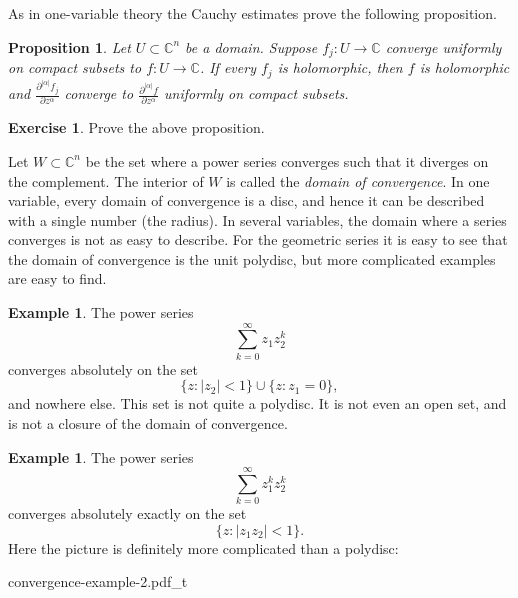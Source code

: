 \documentclass[12pt,openany]{book}
\newcommand{\sabs}[1]{\lvert {#1} \rvert}
\newcommand{\C}{{\mathbb{C}}}
\newcommand{\myindex}[1]{#1\index{#1}}
\theoremstyle{plain}
\newtheorem{prop}[thm]{Proposition}
\theoremstyle{remark}
\theoremstyle{definition}
\newenvironment{exbox}{%
    \def\FrameCommand{\vrule width 1pt \relax\hspace {10pt}}%
    \MakeFramed {\advance \hsize -\width \FrameRestore }%
}{%
    \endMakeFramed
}
\theoremstyle{exercise}
\newtheorem{exercise}{Exercise}[section]
\theoremstyle{example}
\newtheorem{example}[thm]{Example}
\begin{document}
As in one-variable theory the Cauchy estimates prove the following
proposition.

\begin{prop}
Let $U \subset \C^n$ be a domain.
Suppose $f_j \colon U \to \C$ converge uniformly on compact subsets
to $f \colon U \to \C$.  If every $f_j$ is holomorphic, then $f$ is
holomorphic and 
$\frac{\partial^{\sabs{\alpha}} f_j}{\partial z^\alpha}$ converge to
$\frac{\partial^{\sabs{\alpha}} f}{\partial z^\alpha}$ uniformly on compact
subsets.
\end{prop}

\begin{exbox}
\begin{exercise}
Prove the above proposition.
\end{exercise}
\end{exbox}

Let $W \subset \C^n$ be the set where a power series converges
such that it diverges on the complement.  The interior of $W$
is called the
\emph{\myindex{domain of convergence}}.
In one variable, every domain of convergence is a disc, and hence it can be
described with a single number (the radius).
In several variables, the domain where a series
converges is not as easy to describe.
For the geometric series it is easy to see
that the domain of convergence is the unit polydisc, but more
complicated examples are easy to find.

\begin{example}
The power series
\begin{equation*}
\sum_{k=0}^\infty z_1 z_2^k
\end{equation*}
converges absolutely on the set
\begin{equation*}
\{ z : \sabs{z_2} < 1 \} \cup \{ z : z_1 = 0 \} ,
\end{equation*}
and nowhere else.
This set is not quite a polydisc.  It is not even an open set, and
is not a closure of the domain of convergence.
\end{example}

\begin{example}
The power series
\begin{equation*}
\sum_{k=0}^\infty z_1^k z_2^k
\end{equation*}
converges absolutely exactly on the set
\begin{equation*}
\{ z : \sabs{z_1 z_2} < 1 \} .
\end{equation*}
Here the picture is definitely more complicated than a polydisc:

\medskip

\begin{center}
{convergence-example-2.pdf_t}
\end{center}
\end{example}
\end{document}
